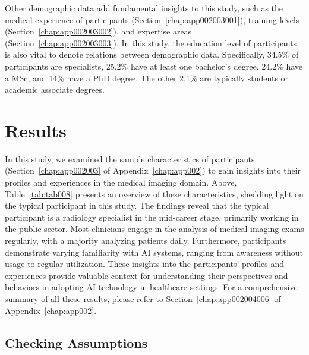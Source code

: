 

Other demographic data add fundamental insights to this study, such as the medical experience of participants (Section~\ref{chap:app002003001}), training levels (Section~\ref{chap:app002003002}), and expertise areas (Section~\ref{chap:app002003003}).
In this study, the education level of participants is also vital to denote relations between demographic data.
Specifically, 34.5\% of participants are specialists, 25.2\% have at least one bachelor's degree, 24.2\% have a \ac{MSc}, and 14\% have a \ac{PhD} degree.
The other 2.1\% are typically students or academic associate degrees.

\section{Results}
\label{sec:chap004005}

In this study, we examined the sample characteristics of participants (Section~\ref{chap:app002003} of Appendix~\ref{chap:app002}) to gain insights into their profiles and experiences in the medical imaging domain.
\textcolor{revised}{Above, Table~\ref{tab:tab008} presents an overview of these characteristics, shedding light on the typical participant in this study.}
The findings reveal that the typical participant is a radiology specialist in the mid-career stage, primarily working in the public sector.
Most clinicians engage in the analysis of medical imaging exams regularly, with a majority analyzing patients daily.
Furthermore, participants demonstrate varying familiarity with \ac{AI} systems, ranging from awareness without usage to regular utilization.
These insights into the participants' profiles and experiences provide valuable context for understanding their perspectives and behaviors in adopting \ac{AI} technology in healthcare settings.
For a comprehensive summary of all these results, please refer to Section~\ref{chap:app002004006} of Appendix~\ref{chap:app002}.

\subsection{Checking Assumptions}
\label{sec:chap004005001}

